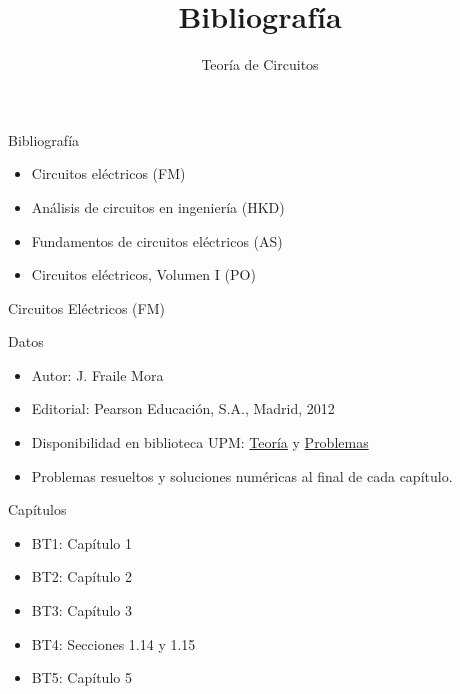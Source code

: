 \documentclass[aspectratio=169, xcolor={usenames,svgnames,dvipsnames}]{beamer}
\date{}
\title{Bibliografía}
\subtitle{Teoría de Circuitos}
\begin{document}
\maketitle


\begin{frame}[label={sec:org96b7143}]{Bibliografía}
\begin{itemize}
\item Circuitos eléctricos (\alert{FM})
\item Análisis de circuitos en ingeniería (\alert{HKD})
\item Fundamentos de circuitos eléctricos (\alert{AS})
\item Circuitos eléctricos, Volumen I (\alert{PO})
\end{itemize}
\end{frame}


\begin{frame}[label={sec:orgd4f499a}]{Circuitos Eléctricos (\alert{FM})}
\begin{block}{Datos}
\begin{itemize}
\item Autor: J. Fraile Mora
\item Editorial: Pearson Educación, S.A., Madrid, 2012
\item Disponibilidad en biblioteca UPM: \href{https://ingenio.upm.es/primo-explore/fulldisplay?docid=34UPM\_ALMA2150534070004212\&context=L\&vid=34UPM\_VU1\&search\_scope=TAB1\_SCOPE1\&tab=tab1\&lang=es\_ES}{Teoría} y \href{https://ingenio.upm.es/permalink/f/1vo0cl5/34UPM\_ALMA2164586310004212}{Problemas}
\item Problemas resueltos y soluciones numéricas al final de cada capítulo.
\end{itemize}
\end{block}

\begin{block}{Capítulos}
\begin{itemize}
\item BT1: Capítulo 1
\item BT2: Capítulo 2
\item BT3: Capítulo 3
\item BT4: Secciones 1.14 y 1.15
\item BT5: Capítulo 5
\end{itemize}
\end{block}
\end{frame}
\end{document}
